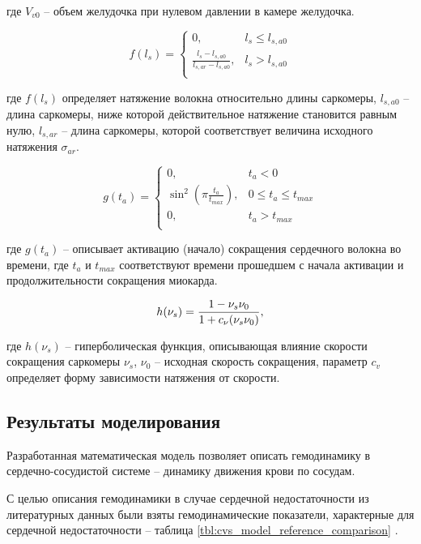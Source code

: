 \noindent где $V_{v0}$ -- объем желудочка при нулевом давлении в камере желудочка. 

\begin{equation}
	f(l_s) =  \begin{cases} 0, & l_s \leq l_{s,a0} \\ \frac{l_s - l_{s,a0}}{l_{s,ar} - l_{s,a0}}, & l_s > l_{s,a0} \\ \end{cases}
\end{equation}

\noindent где $f(l_s)$ определяет натяжение волокна относительно длины саркомеры, $l_{s,a0}$ -- длина саркомеры, ниже которой действительное натяжение становится равным нулю, $l_{s,ar}$ -- длина саркомеры, которой соответствует величина исходного натяжения $\sigma_{ar}$.

\begin{equation}
	g(t_a) = \begin{cases} 0, &t_a < 0 \\ \sin^2 \left(\pi \frac{t_a}{t_{max}} \right), &0 \leq t_a \leq t_{max} \\ 0, &t_a > t_{max} \\  \end{cases}
\end{equation}

\noindent где $g(t_a)$ -- описывает активацию (начало) сокращения сердечного волокна во времени, где $t_a$ и $t_{max}$ соответствуют времени прошедшем с начала активации и продолжительности сокращения миокарда. 

\begin{equation}
	h(\nu_s) = \frac{1 - \nu_s \/ \nu_0}{1 + c_\nu (\nu_s \/ \nu_0)},
\end{equation}

\noindent где $h(\nu_s)$ -- гиперболическая функция, описывающая влияние скорости сокращения саркомеры $\nu_s$, $\nu_0$ -- исходная скорость сокращения, параметр $c_v$ определяет форму зависимости натяжения от скорости. 

\subsection{Результаты моделирования}

Разработанная математическая модель позволяет описать гемодинамику в сердечно-сосудистой системе -- динамику движения крови по сосудам. 

С целью описания гемодинамики в случае сердечной недостаточности из литературных данных были взяты гемодинамические показатели, характерные для сердечной недостаточности -- таблица \ref{tbl:cvs_model_reference_comparison} \cite{Cox_2009, Martina_2013_simulation}. 

